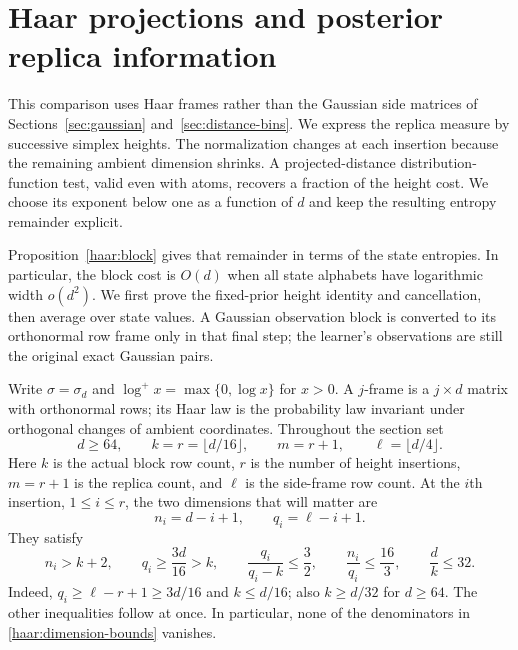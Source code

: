 \section{Haar projections and posterior replica information}
\label{sec:haar}

This comparison uses Haar frames rather than the Gaussian side matrices
of Sections~\ref{sec:gaussian} and~\ref{sec:distance-bins}.  We express the
replica measure by successive simplex heights.  The normalization changes
at each insertion because the remaining ambient dimension shrinks.
A projected-distance distribution-function test, valid even with atoms,
recovers a fraction of the height cost.  We choose its exponent below one
as a function of $d$ and keep the resulting entropy remainder explicit.

Proposition~\ref{haar:block} gives that remainder in terms of the state
entropies.  In particular, the block cost is $O(d)$ when all state
alphabets have logarithmic width $o(d^2)$.  We first prove the fixed-prior
height identity and cancellation, then average over state values.  A Gaussian observation
block is converted to its orthonormal row frame only in that final step;
the learner's observations are still the original exact Gaussian pairs.

Write $\sigma=\sigma_d$ and $\log^+x=\max\{0,\log x\}$ for $x>0$.
A $j$-frame is a
$j\times d$ matrix with orthonormal rows; its Haar law is the probability
law invariant under orthogonal changes of ambient coordinates.  Throughout
the section set
\begin{equation}\label{haar:dimensions}
 d\ge64,\qquad k=r=\lfloor d/16\rfloor,\qquad m=r+1,
 \qquad \ell=\lfloor d/4\rfloor.
\end{equation}
Here $k$ is the actual block row count, $r$ is the number of height
insertions, $m=r+1$ is the replica count, and $\ell$ is the side-frame
row count.
At the $i$th insertion, $1\le i\le r$, the two dimensions that
will matter are
\begin{equation}\label{haar:dimension-slack}
 n_i=d-i+1,\qquad q_i=\ell-i+1.
\end{equation}
They satisfy
\begin{equation}\label{haar:dimension-bounds}
 n_i>k+2,\qquad q_i\ge\frac{3d}{16}>k,
 \qquad \frac{q_i}{q_i-k}\le\frac32,
 \qquad \frac{n_i}{q_i}\le\frac{16}{3},\qquad \frac d k\le32.
\end{equation}
Indeed, $q_i\ge\ell-r+1\ge3d/16$ and $k\le d/16$; also
$k\ge d/32$ for $d\ge64$.  The other inequalities follow at once.  In
particular, none of the denominators in \eqref{haar:dimension-bounds}
vanishes.


